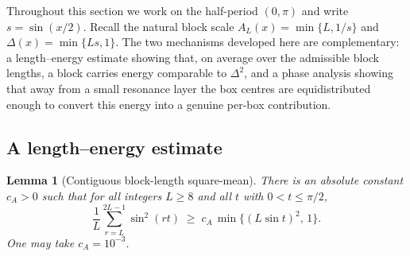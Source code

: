 \documentclass[11pt,reqno]{amsart}
\theoremstyle{plain}
\newtheorem{lemma}{Lemma}
\theoremstyle{definition}
\theoremstyle{remark}
\begin{document}
Throughout this section we work on the half-period $(0,\pi)$ and write $s=\sin(x/2)$. Recall the natural block scale $A_L(x)=\min\{L,1/s\}$ and $\Delta(x)=\min\{Ls,1\}$. The two mechanisms developed here are complementary: a length--energy estimate showing that, on average over the admissible block lengths, a block carries energy comparable to $\Delta^2$, and a phase analysis showing that away from a small resonance layer the box centres are equidistributed enough to convert this energy into a genuine per-box contribution.

\subsection{A length--energy estimate}

\begin{lemma}[Contiguous block-length square-mean]\label{lem:length-energy}
There is an absolute constant $c_A>0$ such that for all integers $L\ge 8$ and all $t$ with $0<t\le\pi/2$,
\[
\frac{1}{L}\sum_{r=L}^{2L-1}\sin^2(rt)\;\ge\;c_A\,\min\{(L\sin t)^2,\,1\}.
\]
One may take $c_A=10^{-3}$.
\end{lemma}
\end{document}
